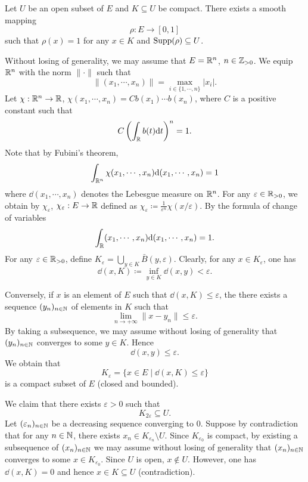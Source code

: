 \begin{propositionenv}
    Let $U$ be an open subset of $E$ and $K \subseteq U$ be compact.
    There exists a smooth mapping
    $$\rho : E \longrightarrow [0,1]$$
    such that $\rho(x) = 1$ for any $x \in K$ and $\operatorname{\mathrm{Supp}}(\rho) \subseteq U$.
\end{propositionenv}
\begin{proofenv}
    Without losing of generality, we may assume that $E = \mathbb{R}^n$, $n \in \mathbb{Z}_{>0}$.
    We equip $\mathbb{R}^n$ with the norm $\|\cdot\|$ such that
    $$\|(x_1,\cdots,x_n)\| = \max_{i \in \{1,\cdots,n\}} |x_i|.$$
    Let $\chi : \mathbb{R}^n \rightarrow \mathbb{R}$, $\chi(x_1,\cdots,x_n) = C b(x_1) \cdots b(x_n)$,
    where $C$ is a positive constant such that
    $$C\left(\int_{\mathbb{R}} b(t) \mathrm{d} t\right)^n = 1.$$
    Note that by Fubini's theorem,
    $$\int_{\mathbb{R}^n} \chi(x_1,\cdots,x_n)\mathrm{d}(x_1,\cdots,x_n) = 1$$
    where $\dd (x_1,\cdots,x_n)$ denotes the Lebesgue measure on $\mathbb{R}^n$.
    For any $\varepsilon \in \mathbb{R}_{>0}$, we obtain by $\chi_{\varepsilon}$,
    $\chi_{\varepsilon} : E \rightarrow \mathbb{R}$ defined as $\chi_{\varepsilon} \coloneq \frac{1}{\varepsilon^n} \chi(x/\varepsilon)$.
    By the formula of change of variables
    $$\int_{\mathbb{R}} (x_1,\cdots,x_n) \mathrm{d}(x_1,\cdots,x_n) = 1.$$
    For any $\varepsilon \in \mathbb{R}_{>0}$, define $K_{\varepsilon} = \bigcup_{y \in K}\bar{B}(y,\varepsilon)$.
    Clearly, for any $x \in K_{\varepsilon}$, one has
    $$\dd(x,K) \coloneq \inf_{y \in K} \dd(x,y) < \varepsilon.$$

    \quad Conversely, if $x$ is an element of $E$ such that $\dd(x,K)\le \varepsilon$, the there exists a sequence $(y_n)_{n \in \mathbb{N}}$ of elements in $K$ such that
    $$\lim_{n\rightarrow +\infty}\|x - y_n\|\le \varepsilon.$$
    By taking a subsequence, we may assume without losing of generality that $(y_n)_{n \in \mathbb{N}}$ converges to some $y \in K$.
    Hence
    $$\dd(x,y) \le \varepsilon.$$
    We obtain that
    $$K_{\varepsilon} = \{x \in E \mid \dd(x,K) \le \varepsilon\}$$
    is a compact subset of $E$ (closed and bounded).
    
    \quad We claim that there exists $\varepsilon > 0$ such that
    $$K_{2\varepsilon} \subseteq U.$$
    Let $(\varepsilon_n)_{n \in \mathbb{N}}$ be a decreasing sequence converging to $0$.
    Suppose by contradiction that for any $n \in \mathbb{N}$, there exists $x_n \in K_{\varepsilon_n} \setminus U$.
    Since $K_{\varepsilon_0}$ is compact,
    by existing a subsequence of $(x_n)_{n \in \mathbb{N}}$ we may assume without losing of generality that $(x_n)_{n \in \mathbb{N}}$ converges to some $x \in K_{\varepsilon_0}$.
    Since $U$ is open, $x \notin U$.
    However, one has $\dd(x,K) = 0$ and hence $x \in K \subseteq U$ (contradiction).
    

\end{proofenv}
